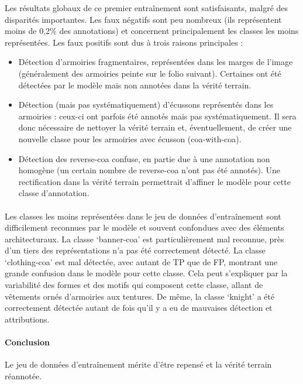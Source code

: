 \documentclass[12pt,twoside]{book}
\begin{document}
Les résultats globaux de ce premier entraînement sont satisfaisants, malgré des disparités importantes. Les faux négatifs sont peu nombreux (ils représentent moins de 0,2\% des annotations) et concernent principalement les classes les moins représentées. Les faux positifs sont dus à trois raisons principales : \\
\begin{itemize}
    \item Détection d’armoiries fragmentaires, représentées dans les marges de l’image (généralement des armoiries peinte sur le folio suivant). Certaines ont été détectées par le modèle mais non annotées dans la vérité terrain.
    \item Détection (mais pas systématiquement) d'écussons représentés dans les armoiries : ceux-ci ont parfois été annotés mais pas systématiquement. Il sera donc nécessaire de nettoyer la vérité terrain et, éventuellement, de créer une nouvelle classe pour les armoiries avec écusson (coa-with-coa).
    \item Détection des reverse-coa confuse, en partie due à une annotation non homogène (un certain nombre de reverse-coa n’ont pas été annotés). Une rectification dans la vérité terrain permettrait d’affiner le modèle pour cette classe d’annotation.
\end{itemize}

\paragraph{}Les classes les moins représentées dans le jeu de données d’entraînement sont difficilement reconnues par le modèle et souvent confondues avec des éléments architecturaux. La classe ‘banner-coa’ est particulièrement mal reconnue, près d’un tiers des représentations n’a pas été correctement détecté. La classe ‘clothing-coa’ est mal détectée, avec autant de TP que de FP, montrant une grande confusion dans le modèle pour cette classe. Cela peut s’expliquer par la variabilité des formes et des motifs qui composent cette classe, allant de vêtements ornés d’armoiries aux tentures. De même, la classe ‘knight’ a été correctement détectée autant de fois qu’il y a eu de mauvaises détection et attributions.

\paragraph{Conclusion}Le jeu de données d’entraînement mérite d’être repensé et la vérité terrain réannotée.
\end{document}
